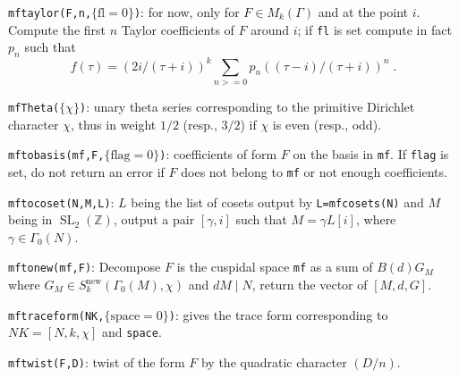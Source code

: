 \documentclass[11pt]{article}
\DeclareMathOperator{\SL}{SL}
\newcommand{\Z}{{\mathbb Z}}
\newcommand{\ga}{\gamma}
\newcommand{\G}{\Gamma}
\newcommand{\new}{\text{new}}
\def\kbd#1{{\tt #1}}
\begin{document}
\f\kbd{mftaylor(F,n,$\{\text{fl}=0\}$)}: for now, only for $F\in M_k(\G)$ and
at the point $i$. Compute the first $n$ Taylor coefficients of $F$ around
$i$; if \kbd{fl} is set compute in fact $p_n$ such that
$$f(\tau)=(2i/(\tau+i))^k\sum_{n>=0}p_n((\tau-i)/(\tau+i))^n\;.$$

\f\kbd{mfTheta($\{\chi\}$)}: unary theta series corresponding to the primitive
Dirichlet character $\chi$, thus in weight $1/2$ (resp., $3/2$)
if $\chi$ is even (resp., odd).

\f\kbd{mftobasis(mf,F,$\{\text{flag}=0\}$)}: coefficients of form $F$ on the
basis in \kbd{mf}. If \kbd{flag} is set, do not return an error if $F$ does
not belong to \kbd{mf} or not enough coefficients.

\f\kbd{mftocoset(N,M,L)}: $L$ being the list of cosets output by
\kbd{L=mfcosets(N)} and $M$ being in $\SL_2(\Z)$, output a pair
$[\ga,i]$ such that $M=\ga L[i]$, where $\ga\in \G_0(N)$.

\f\kbd{mftonew(mf,F)}: Decompose $F$ is the cuspidal space \kbd{mf} as
a sum of $B(d)G_M$ where $G_M\in S_k^{\new}(\G_0(M),\chi)$ and $dM\mid N$,
return the vector of $[M,d,G]$.

\f\kbd{mftraceform(NK,$\{\text{space}=0\}$)}: gives the trace form
corresponding to $NK=[N,k,\chi]$ and \kbd{space}.

\f\kbd{mftwist(F,D)}: twist of the form $F$ by the quadratic character
$(D/n)$.
\end{document}
